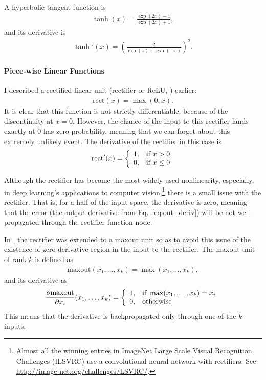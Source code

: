\documentclass{report}
\newcommand{\rect}{\text{rect}}
\newcommand{\maxout}{\text{maxout}}
\begin{document}
A hyperbolic tangent function is
\begin{align*}
    \tanh(x) =  \frac{\exp(2x) -1}{\exp(2x) + 1},
\end{align*}
and its derivative is 
\begin{align*}
    \tanh'(x) = \left(\frac{2}{\exp(x)+\exp(-x)}\right)^2.
\end{align*}

\paragraph{Piece-wise Linear Functions}

I described a rectified linear unit (rectifier or ReLU,
\cite{nair2010rectified,glorot2011deep}) earlier:
\begin{align*}
    \rect(x) = \max(0, x).
\end{align*}
It is clear that this function is not strictly differentiable, because of the
discontinuity at $x=0$. However, the chance of the input to this rectifier lands
exactly at $0$ has zero probability, meaning that we can forget about this
extremely unlikely event. The derivative of the rectifier in this case is
\begin{align*}
    \rect'(x) = \left\{ 
        \begin{array}{l l}
            1, & \text{if }x > 0 \\
            0, & \text{if }x \leq 0
        \end{array}
        \right.
\end{align*}

Although the rectifier has become the most widely used nonlinearity, especially,
in deep learning's applications to computer vision,\footnote{
    Almost all the winning entries in ImageNet Large Scale Visual Recognition
    Challenges (ILSVRC) use a convolutional neural network with rectifiers. See
    \url{http://image-net.org/challenges/LSVRC/}.
}
there is a small issue with the rectifier. That is, for a half of the input
space, the derivative is zero, meaning that the error (the output derivative
from Eq.~\eqref{eq:out_deriv}) will be not well propagated through the rectifier
function node.

In \cite{goodfellow2013maxout}, the rectifier was extended to a maxout unit so
as to avoid this issue of the existence of zero-derivative region in the input
to the rectifier. The maxout unit of rank $k$ is defined as
\begin{align*}
    \maxout(x_1, \ldots, x_k) = \max(x_1, \ldots, x_k),
\end{align*}
and its derivative as
\begin{align*}
    \frac{\partial \maxout}{\partial x_i}(x_1, \dots, x_k) = 
    \left\{
        \begin{array}{l l}
            1, & \text{if } \max(x_1, \ldots, x_k) = x_i \\
            0, & \text{otherwise}
        \end{array}
        \right.
\end{align*}
This means that the derivative is backpropagated only through one of the $k$
inputs.
\end{document}
